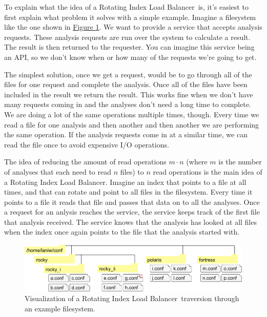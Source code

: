 \documentclass[11pt]{article} %
\newcommand{\rilb}{Rotating Index Load Balancer}
\newcommand{\hidelinks}[1]{{\hypersetup{hidelinks}#1}}
\newcommand{\figref}[1]{\hidelinks{\hyperref[#1]{Figure \ref{#1}}}}
\begin{document}
  To explain what the idea of a \rilb\ is, it's easiest to first explain what problem it solves with a simple example. Imagine a filesystem like the one shown in \figref{fig:rilb-vis}. We want to provide a service that accepts analysis requests. These analysis requests are run over the system to calculate a result. The result is then returned to the requester. You can imagine this service being an API, so we don't know when or how many of the requests we're going to get.

  The simplest solution, once we get a request, would be to go through all of the files for one request and complete the analysis. Once all of the files have been included in the result we return the result. This works fine when we don't have many requests coming in and the analyses don't need a long time to complete. We are doing a lot of the same operations multiple times, though. Every time we read a file for one analysis and then another and then another we are performing the same operation. If the analysis requests come in at a similar time, we can read the file once to avoid expensive I/O operations.

  The idea of reducing the amount of read operations $m \cdot n$ (where $m$ is the number of analyses that each need to read $n$ files) to $n$ read operations is the main idea of a \rilb. Imagine an index that points to a file at all times, and that can rotate and point to all files in the filesystem. Every time it points to a file it reads that file and passes that data on to all the analyses. Once a request for an anlysis reaches the service, the service keeps track of the first file that analysis received. The service knows that the analysis has looked at all files when the index once again points to the file that the analysis started with.

  \begin{figure}[H]
    \centering
    \includegraphics[width=.99\linewidth, keepaspectratio]{res/rilb_visualization}
    \caption{Visualization of a \rilb\ traversion through an example filesystem.}
    \label{fig:rilb-vis}
  \end{figure}
\end{document}
